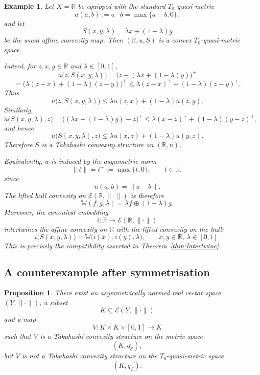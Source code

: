 \documentclass[preprint,12pt]{elsarticle}
\numberwithin{equation}{section}
\newtheorem{proposition}[theorem]{Proposition}
\newtheorem{example}[theorem]{Example}
\newcommand{\E}{\mathcal{E}}
\begin{document}
\begin{example}\label{ex:Rstandard}
Let \(X=\mathbb R\) be equipped with the standard \(T_{0}\)-quasi-metric
\[
u(a,b):=a\dot{-}b=\max\{a-b,0\},
\]
and let
\[
S(x,y,\lambda)=\lambda x+(1-\lambda)y
\]
be the usual affine convexity map.  Then \((\mathbb R,u,S)\) is a convex
\(T_{0}\)-quasi-metric space.

Indeed, for \(z,x,y\in\mathbb R\) and \(\lambda\in[0,1]\),
\[
u\bigl(z,S(x,y,\lambda)\bigr)
=
\bigl(z-(\lambda x+(1-\lambda)y)\bigr)^{+}
\]
\[
=
\bigl(\lambda(z-x)+(1-\lambda)(z-y)\bigr)^{+}
\le
\lambda(z-x)^{+}+(1-\lambda)(z-y)^{+}.
\]
Thus
\[
u\bigl(z,S(x,y,\lambda)\bigr)
\le
\lambda u(z,x)+(1-\lambda)u(z,y).
\]
Similarly,
\[
u\bigl(S(x,y,\lambda),z\bigr)
=
\bigl((\lambda x+(1-\lambda)y)-z\bigr)^{+}
\le
\lambda(x-z)^{+}+(1-\lambda)(y-z)^{+},
\]
and hence
\[
u\bigl(S(x,y,\lambda),z\bigr)
\le
\lambda u(x,z)+(1-\lambda)u(y,z).
\]
Therefore \(S\) is a Takahashi convexity structure on \((\mathbb R,u)\).

Equivalently, \(u\) is induced by the asymmetric norm
\[
\|t\|=t^{+}:=\max\{t,0\},
\qquad t\in\mathbb R,
\]
since
\[
u(a,b)=\|a-b\|.
\]
The lifted hull convexity on \(\E(\mathbb R,\|\cdot\|)\) is therefore
\[
\mathbb W(f,g,\lambda)=\lambda f\oplus(1-\lambda)g.
\]
Moreover, the canonical embedding
\[
i:\mathbb R\longrightarrow \E(\mathbb R,\|\cdot\|)
\]
intertwines the affine convexity on \(\mathbb R\) with the lifted convexity on
the hull:
\[
i\bigl(S(x,y,\lambda)\bigr)
=
\mathbb W\bigl(i(x),i(y),\lambda\bigr),
\qquad x,y\in\mathbb R,\ \lambda\in[0,1].
\]
This is precisely the compatibility asserted in
Theorem~\ref{thm:Intertwine}.
\end{example}

\subsection{A counterexample after symmetrisation}

\begin{proposition}\label{prop:counter}
There exist an asymmetrically normed real vector space \((Y,\|\cdot\|)\), a
subset
\[
K\subseteq \E(Y,\|\cdot\|)
\]
and a map
\[
V:K\times K\times[0,1]\longrightarrow K
\]
such that \(V\) is a Takahashi convexity structure on the metric space
\[
(K,q_{\E}^{s}),
\]
but \(V\) is not a Takahashi convexity structure on the \(T_{0}\)-quasi-metric
space
\[
(K,q_{\E}).
\]
\end{proposition}
\end{document}
